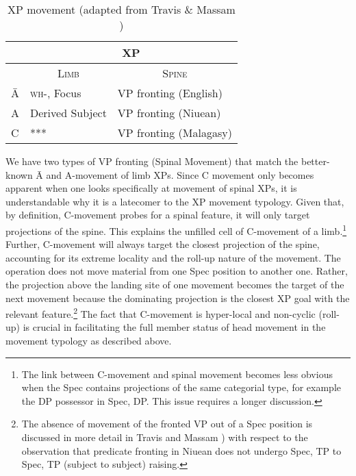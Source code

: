 \documentclass[output=paper,colorlinks,citecolor=brown,
]{langscibook}
\begin{document}
\begin{table}
\caption{XP movement (adapted from Travis \& Massam \citeyear{Travis:2021})}
\footnotesize
\begin{tabular}{ l  l  l }
\hline
\hline
& \multicolumn{2}{c}{XP} \\
\hline
&\multicolumn{1}{c}{\textsc{Limb}} & \multicolumn{1}{c}{\textsc{Spine}}   \\
\hline
\hline
\=A &  \textsc{wh-}, Focus & VP fronting (English)   \\
\hline
A  & Derived Subject&  VP fronting (Niuean)    \\
\hline
C  & ***  &  VP fronting (Malagasy) \\
\hline
\hline
\end{tabular}
\end{table}

\normalsize

We have two types of VP fronting (Spinal Movement) that match the better-known \=A and A-movement of limb XPs.  Since C movement only becomes apparent when one looks specifically at movement of spinal XPs, it is understandable why it is a latecomer to the XP movement typology.  Given that, by definition, C-movement probes for a spinal feature, it will only target projections of the spine.  This explains the unfilled cell of C-movement of a limb.\footnote{The link between C-movement and spinal movement becomes less obvious when the Spec contains projections of the same categorial type, for example the DP possessor in Spec, DP. This issue requires a longer discussion.}    Further, C-movement will always target the closest projection of the spine, accounting for its extreme locality and the roll-up nature of the movement. The operation does not move material from one Spec position to another one. Rather, the projection above the landing site of one movement becomes the target of the next movement because the dominating projection is the closest XP goal with the relevant feature.\footnote{The absence of movement of the fronted VP out of a Spec position is discussed in more detail in Travis and Massam \citeyearpar{Travis:2021}) with respect to the observation that predicate fronting in Niuean does not undergo Spec, TP to Spec, TP (subject to subject) raising.}   The fact that C-movement is hyper-local and non-cyclic (roll-up) is crucial in facilitating the full member status of head movement in the movement typology as described above.  
\end{document}
